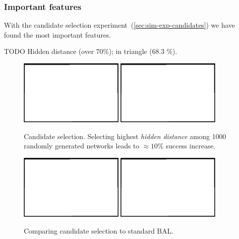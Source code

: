 
\subsubsection{Important features}
\label{sec:results-candidates} 

With the candidate selection experiment~(\ref{sec:sim-exp-candidates}) we have found the most important features. 

TODO Hidden distance (over 70\%); in triangle (68.3 \%). \\


\begin{figure}[H]
  \centering
  \includegraphics[width=0.45\textwidth]{img/placeholder.png}  %
  \includegraphics[width=0.45\textwidth]{img/placeholder.png}  %
  \caption{Candidate selection. Selecting highest \emph{hidden distance} among 1000 randomly generated networks leads to $\approx 10\%$ success increase.}
  \label{fig:results-candidates-tlr}
\end{figure}


\begin{figure}[H]
  \centering
  \includegraphics[width=0.45\textwidth]{img/placeholder.png}  %
  \includegraphics[width=0.45\textwidth]{img/placeholder.png}  %
  \caption{Comparing candidate selection to standard BAL.}
  \label{fig:results-candidates-epoch}
\end{figure}

